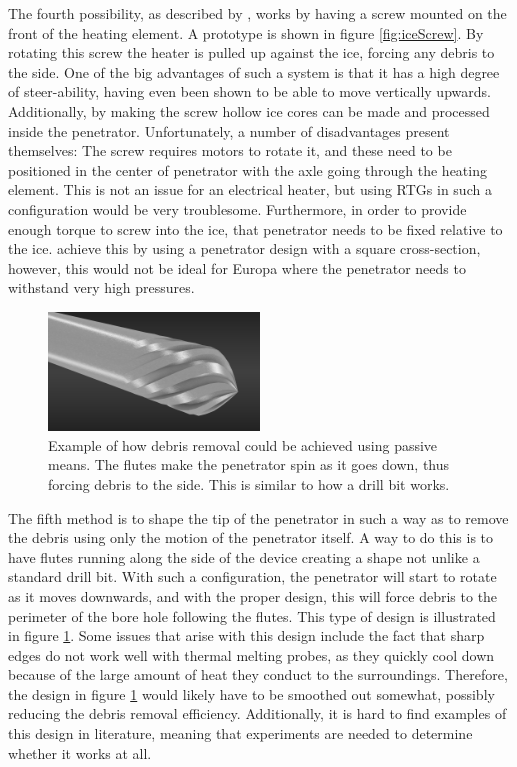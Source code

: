 \noindent
The fourth possibility, as described by \citet{article:dachwald2014a}, works by having a screw mounted on the front of the heating element. A prototype is shown in figure \ref{fig:iceScrew}. By rotating this screw the heater is pulled up against the ice, forcing any debris to the side. One of the big advantages of such a system is that it has a high degree of steer-ability, having even been shown to be able to move vertically upwards\cite{article:dachwald2014a}.  
Additionally, by making the screw hollow ice cores can be made and processed inside the penetrator. Unfortunately, a number of disadvantages present themselves: The screw requires motors to rotate it, and these need to be positioned in the center of penetrator with the axle going through the heating element. This is not an issue for an electrical heater, but using RTGs in such a configuration would be very troublesome. Furthermore, in order to provide enough torque to screw into the ice, that penetrator needs to be fixed relative to the ice. \citet{article:dachwald2014a} achieve this by using a penetrator design with a square cross-section, however, this would not be ideal for Europa where the penetrator needs to withstand very high pressures.\\

 \begin{figure}[ht]
 	\centering
 	\includegraphics[width=0.5\textwidth]{figures/LAMC/flutedHead}
 	\caption{Example of how debris removal could be achieved using passive means. The flutes make the penetrator spin as it goes down, thus forcing debris to the side. This is similar to how a drill bit works.}
 	\label{fig:flutedHead}
 \end{figure}  

\noindent
The fifth method is to shape the tip of the penetrator in such a way as to remove the debris using only the motion of the penetrator itself. A way to do this is to have flutes running along the side of the device creating a shape not unlike a standard drill bit. With such a configuration, the penetrator will start to rotate as it moves downwards, and with the proper design, this will force debris to the perimeter of the bore hole following the flutes. This type of design is illustrated in figure \ref{fig:flutedHead}.  
Some issues that arise with this design include the fact that sharp edges do not work well with thermal melting probes, as they quickly cool down because of the large amount of heat they conduct to the surroundings. Therefore, the design in figure \ref{fig:flutedHead} would likely have to be smoothed out somewhat, possibly reducing the debris removal efficiency. Additionally, it is hard to find examples of this design in literature, meaning that experiments are needed to determine whether it works at all. \\

